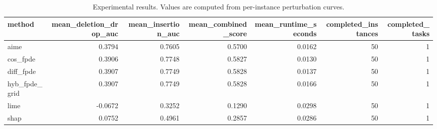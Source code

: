 \begin{table}[t]
\caption{Experimental results. Values are computed from per-instance perturbation curves.}
\label{tab:main_results_computed}
\centering
\begin{tabular}{lrrrrrr}
\toprule
method & mean\_deletion\_drop\_auc & mean\_insertion\_auc & mean\_combined\_score & mean\_runtime\_seconds & completed\_instances & completed\_tasks \\
\midrule
aime & 0.3794 & 0.7605 & 0.5700 & 0.0162 & 50 & 1 \\
cos\_fpde & 0.3906 & 0.7748 & 0.5827 & 0.0130 & 50 & 1 \\
diff\_fpde & 0.3907 & 0.7749 & 0.5828 & 0.0137 & 50 & 1 \\
hyb\_fpde\_grid & 0.3907 & 0.7749 & 0.5828 & 0.0166 & 50 & 1 \\
lime & -0.0672 & 0.3252 & 0.1290 & 0.0298 & 50 & 1 \\
shap & 0.0752 & 0.4961 & 0.2857 & 0.0286 & 50 & 1 \\
\bottomrule
\end{tabular}

\end{table}

